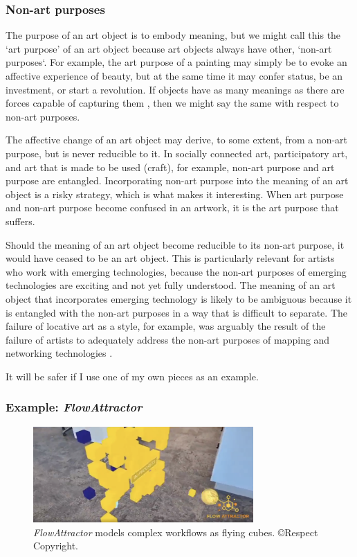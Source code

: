 \documentclass[letterpaper]{article}
\begin{document}
    \subsubsection{Non-art purposes}

    The purpose of an art object is to embody meaning, but we might call this the ‘art purpose’ of an art object because art objects always have other, ‘non-art purposes‘. For example, the art purpose of a painting may simply be to evoke an affective experience of beauty, but at the same time it may confer status, be an investment, or start a revolution. If objects have as many meanings as there are forces capable of capturing them \citep[p.4]{DeleuzeNtschAndPhlsphy2006}, then we might say the same with respect to non-art purposes.

    The affective change of an art object may derive, to some extent, from a non-art purpose, but is never reducible to it. In socially connected art, participatory art, and art that is made to be used (craft), for example, non-art purpose and art purpose are entangled. Incorporating non-art purpose into the meaning of an art object is a risky strategy, which is what makes it interesting. When art purpose and non-art purpose become confused in an artwork, it is the art purpose that suffers. 
    
    Should the meaning of an art object become reducible to its non-art purpose, it would have ceased to be an art object. This is particularly relevant for artists who work with emerging technologies, because the non-art purposes of emerging technologies are exciting and not yet fully understood. The meaning of an art object that incorporates emerging technology is likely to be ambiguous because it is entangled with the non-art purposes in a way that is difficult to separate. The failure of locative art as a style, for example, was arguably the result of the failure of artists to adequately address the non-art purposes of mapping and networking technologies \citep{questioningTheFrame2004}.

    It will be safer if I use one of my own pieces as an example.

    \subsubsection{Example: \emph{FlowAttractor}}

    \begin{figure}[h]
    \includegraphics[width=3.31in]{flow-attractor.png}
    \caption{\emph{FlowAttractor} models complex workflows as flying cubes. \copyright Respect Copyright.}
    \end{figure}
\end{document}
